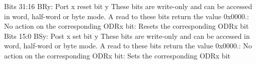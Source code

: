 \documentclass{article}
\begin{document}
Bits 31:16 BRy: Port x reset bit y\newline\newline
These bits are write-only and can be accessed in word, half-word or byte mode. A read to these bits return the value 0x0000.\newline{}: No action on the corresponding ODRx bit\newline{}: Resets the corresponding ODRx bit\newline\newline
Bits 15:0 BSy: Post x set bit y\newline\newline
These bits are write-only and can be accessed in word, half-word or byte mode. A read to these bits return the value 0x0000.\newline{}: No action on the corresponding ODRx bit\newline{}: Sets the corresponding ODRx bit\newline\newline
\end{document}
